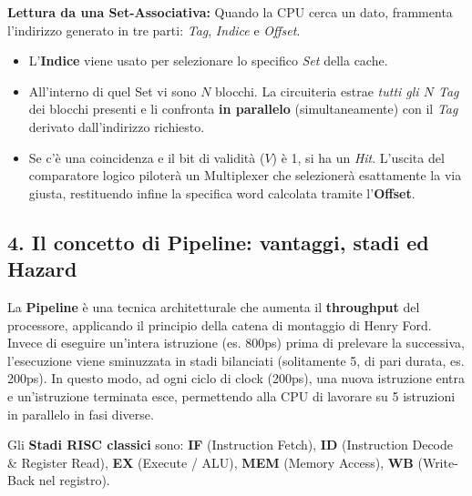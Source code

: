 \documentclass[12pt, a4paper]{article}
\begin{document}
\textbf{Lettura da una Set-Associativa:}
Quando la CPU cerca un dato, frammenta l'indirizzo generato in tre parti: \textit{Tag}, \textit{Indice} e \textit{Offset}.
\begin{itemize}
    \item L'\textbf{Indice} viene usato per selezionare lo specifico \textit{Set} della cache.
    \item All'interno di quel Set vi sono $N$ blocchi. La circuiteria estrae \textit{tutti gli $N$ Tag} dei blocchi presenti e li confronta \textbf{in parallelo} (simultaneamente) con il \textit{Tag} derivato dall'indirizzo richiesto.
    \item Se c'è una coincidenza e il bit di validità ($V$) è 1, si ha un \textit{Hit}. L'uscita del comparatore logico piloterà un Multiplexer che selezionerà esattamente la via giusta, restituendo infine la specifica word calcolata tramite l'\textbf{Offset}.
\end{itemize}

\subsection{4. Il concetto di Pipeline: vantaggi, stadi ed Hazard}
La \textbf{Pipeline} è una tecnica architetturale che aumenta il \textbf{throughput} del processore, applicando il principio della catena di montaggio di Henry Ford. Invece di eseguire un'intera istruzione (es. 800ps) prima di prelevare la successiva, l'esecuzione viene sminuzzata in stadi bilanciati (solitamente 5, di pari durata, es. 200ps). In questo modo, ad ogni ciclo di clock (200ps), una nuova istruzione entra e un'istruzione terminata esce, permettendo alla CPU di lavorare su 5 istruzioni in parallelo in fasi diverse.

Gli \textbf{Stadi RISC classici} sono:
\textbf{IF} (Instruction Fetch), \textbf{ID} (Instruction Decode \& Register Read), \textbf{EX} (Execute / ALU), \textbf{MEM} (Memory Access), \textbf{WB} (Write-Back nel registro).

\newpage
\end{document}
